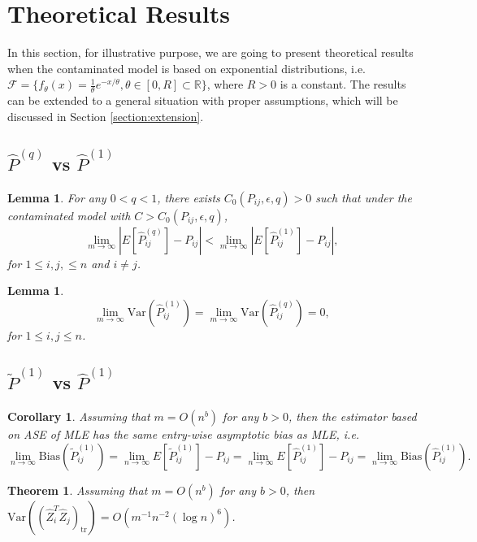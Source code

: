 \documentclass[a4paper]{article}
\newtheorem{lemma}[fact]{Lemma}
\newtheorem{theorem}[fact]{Theorem}
\newtheorem{corollary}[fact]{Corollary}
\begin{document}
\section{Theoretical Results}
\label{section:theory}
In this section, for illustrative purpose, we are going to present theoretical results when the contaminated model is based on exponential distributions, i.e. $\mathcal{F} = \{ f_{\theta}(x) = \frac{1}{\theta} e^{-x/\theta}, \theta \in [0, R] \subset \mathbb{R} \}$, where $R > 0$ is a constant. The results can be extended to a general situation with proper assumptions, which will be discussed in Section \ref{section:extension}.

\subsection{$\hat{P}^{(q)}$ vs $\hat{P}^{(1)}$}
\begin{lemma}
\label{lemma:ELqlEMLE}
For any $0 < q < 1$, there exists $C_0(P_{ij}, \epsilon, q) > 0$ such that under the contaminated model with $C > C_0(P_{ij}, \epsilon, q)$,
\[
	\lim_{m \to \infty} \left| E[\hat{P}^{(q)}_{ij}] - P_{ij} \right| < 
    \lim_{m \to \infty} \left| E[\hat{P}^{(1)}_{ij}] - P_{ij} \right|,
\]
for $1 \le i, j, \le n$ and $i \ne j$.
\end{lemma}

\begin{lemma}
\[
	\lim_{m \to \infty} \mathrm{Var}(\hat{P}^{(1)}_{ij})
    = \lim_{m \to \infty} \mathrm{Var}(\hat{P}^{(q)}_{ij}) = 0,
\]
for $1 \le i, j \le n$.
\end{lemma}


\subsection{$\widetilde{P}^{(1)}$ vs $\hat{P}^{(1)}$}
\begin{corollary}
\label{cor:L1Consistent}
Assuming that $m = O(n^b)$ for any $b > 0$, then the estimator based on ASE of MLE has the same entry-wise asymptotic bias as MLE, i.e.
\[
	\lim_{n \to \infty} \mathrm{Bias}(\widetilde{P}_{ij}^{(1)}) = \lim_{n \to \infty} E[\widetilde{P}_{ij}^{(1)}] - P_{ij} = \lim_{n \to \infty} E[\hat{P}^{(1)}_{ij}] - P_{ij}
    = \lim_{n \to \infty} \mathrm{Bias}(\hat{P}_{ij}^{(1)}).
\]
\end{corollary}

\begin{theorem}
\label{thm:VarASEL1}
Assuming that $m = O(n^b)$ for any $b > 0$, then $\mathrm{Var}((\hat{Z}_i^T \hat{Z}_j)_{\mathrm{tr}}) = O(m^{-1} n^{-2} (\log n)^6)$.
\end{theorem}
\end{document}
